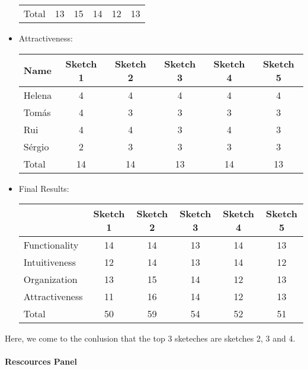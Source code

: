 \begin{itemize}
\begin{table}[H]
\begin{tabular}{l*{5}{c}}
        \hline
        Total & 13 & 15 & 14 & 12 & 13 \\
    \end{tabular}
    \end{table}
\item Attractiveness:
\begin{table}[H]
    \begin{tabular}{l*{5}{c}}
        Name & Sketch 1 & Sketch 2 & Sketch 3 & Sketch 4 & Sketch 5 \\
        \hline 
        Helena & 4 & 4 & 4 & 4 & 4 \\
        Tomás & 4 & 3 & 3 & 3 & 3 \\ 
        Rui & 4 & 4 & 3 & 4 & 3 \\ 
        Sérgio & 2 & 3 & 3 & 3 & 3 \\ 
        \hline
        Total & 14 & 14 & 13 & 14 & 13 \\
    \end{tabular}
    \end{table}
\item Final Results:
\begin{table}[H]
    \begin{tabular}{l*{5}{c}}
        & Sketch 1 & Sketch 2 & Sketch 3 & Sketch 4 & Sketch 5 \\
        \hline 
        Functionality & 14 & 14 & 13 & 14 & 13 \\
        Intuitiveness & 12 & 14 & 13 & 14 & 12 \\ 
        Organization & 13 & 15 & 14 & 12 & 13 \\ 
        Attractiveness & 11 & 16 & 14 & 12 & 13 \\ 
        \hline
        Total & 50 & 59 & 54 & 52 & 51 \\
    \end{tabular}
    \end{table}
\end{itemize} \par 
Here, we come to the conlusion that the top 3 sketeches are
sketches 2, 3 and 4. \\\\
\textbf{Rescources Panel}
